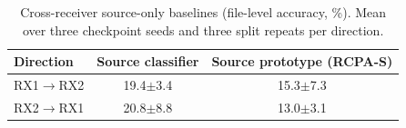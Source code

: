 \begin{table}[t]
\caption{Cross-receiver source-only baselines (file-level accuracy, \%). Mean over three checkpoint seeds and three split repeats per direction.}
\label{tab:baseline}
\centering
\begin{tabular}{lcc}
\toprule
Direction & Source classifier & Source prototype (RCPA-S) \\
\midrule
RX1$\rightarrow$RX2 & 19.4$\pm$3.4 & 15.3$\pm$7.3 \\
RX2$\rightarrow$RX1 & 20.8$\pm$8.8 & 13.0$\pm$3.1 \\
\bottomrule
\end{tabular}
\end{table}
